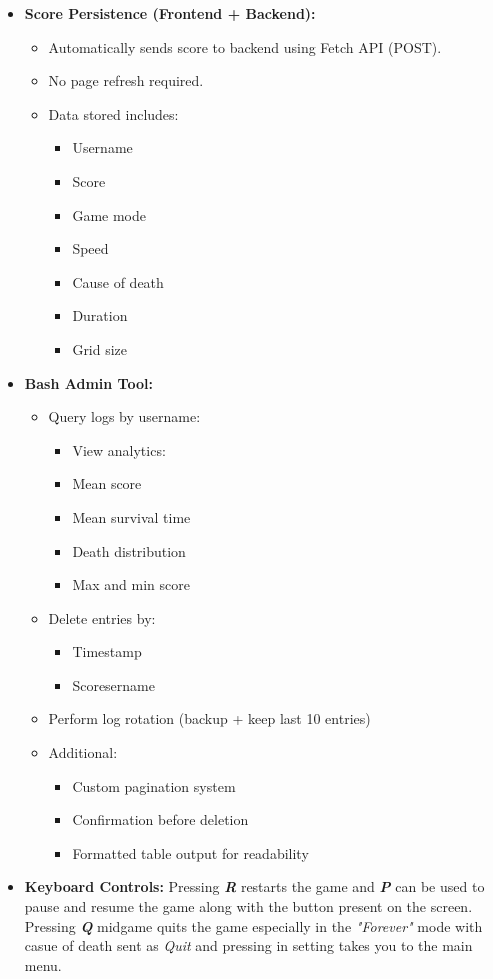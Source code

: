 \begin{itemize}
\begin{itemize}
    \end{itemize}
     \item \textbf{Score Persistence (Frontend + Backend):}
	\begin{itemize}
    \item Automatically sends score to backend using Fetch API (POST).
\item No page refresh required.
\item Data stored includes:
\begin{itemize}
\item Username
\item Score
\item Game mode
\item Speed
\item Cause of death
\item Duration
\item Grid size
\end{itemize}
\end{itemize}
     \item \textbf{Bash Admin Tool:}
	\begin{itemize}
    \item Query logs by username:
    \begin{itemize}
\item View analytics:
\item Mean score
\item Mean survival time
\item Death distribution
\item Max and min score
\end{itemize}
\item Delete entries by:
\begin{itemize}
\item Timestamp
\item Scoresername
\end{itemize}
\item Perform log rotation (backup + keep last 10 entries)
\item Additional:
\begin{itemize}
\item Custom pagination system
\item Confirmation before deletion
\item Formatted table output for readability
\end{itemize}
\end{itemize}
    \item \textbf{Keyboard Controls:} Pressing \textbf{\textit{R}} restarts the game and \textbf{\textit{P}} can be used to pause and resume the game along with the button present on the screen. Pressing \textbf{\textit{Q}} midgame quits the game especially in the \textit{"Forever"} mode with casue of death sent as \textit{Quit} and pressing in setting takes you to the main menu.
\end{itemize}

